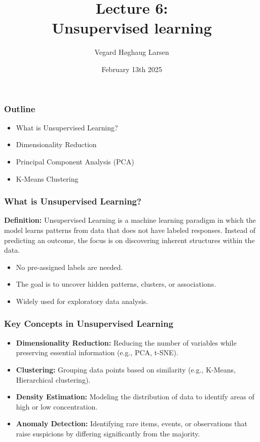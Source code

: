 \documentclass[aspectratio=169]{beamer}
\title{Lecture 6:\\ Unsupervised learning}
\institute{GRA4160: Predictive modelling with machine learning}
\date{February 13th 2025}
\author{Vegard H\o ghaug Larsen}
\begin{document}
\maketitle

\begin{frame}
\frametitle{Outline}
\begin{itemize}
    \item What is Unsupervised Learning?
    \item Dimensionality Reduction
    \item Principal Component Analysis (PCA)
    \item K-Means Clustering
\end{itemize}
\end{frame}

\begin{frame}
    \frametitle{What is Unsupervised Learning?}
    \textbf{Definition:} Unsupervised Learning is a machine learning paradigm in which the model learns patterns from data that does not have labeled responses. Instead of predicting an outcome, the focus is on discovering inherent structures within the data.

    \vspace{0.5cm}
    \begin{itemize}
        \item No pre-assigned labels are needed.
        \item The goal is to uncover hidden patterns, clusters, or associations.
        \item Widely used for exploratory data analysis.
    \end{itemize}
\end{frame}

\begin{frame}
    \frametitle{Key Concepts in Unsupervised Learning}
    \begin{itemize}
        \item \textbf{Dimensionality Reduction:} Reducing the number of variables while preserving essential information (e.g., PCA, t-SNE).
        \item \textbf{Clustering:} Grouping data points based on similarity (e.g., K-Means, Hierarchical clustering).
        \item \textbf{Density Estimation:} Modeling the distribution of data to identify areas of high or low concentration.
        \item \textbf{Anomaly Detection:} Identifying rare items, events, or observations that raise suspicions by differing significantly from the majority.
    \end{itemize}
\end{frame}
\end{document}
